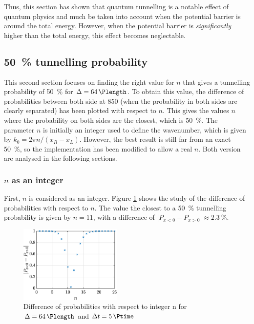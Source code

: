 \documentclass[a4paper,12pt,twoside]{article}
\newcommand{\abs}[1]{\left|#1\right|}
\begin{document}
    Thus, this section has shown that quantum tunnelling is a notable effect of quantum physics and much be taken into account when the potential barrier is around the total energy.
    However, when the potential barrier is \textit{significantly} higher than the total energy, this effect becomes neglectable.\\

  \subsection{\SI{50}{\percent} tunnelling probability} %
    This second section focuses on finding the right value for $n$ that gives a tunnelling probability of \SI{50}{\percent} for $\Delta = \SI{64}{\Plength}$.
    To obtain this value, the difference of probabilities between both side at \SI{850}{\Ptime} (when the probability in both sides are clearly separated) has been plotted with respect to $n$.
    This gives the values $n$ where the probability on both sides are the closest, which is \SI{50}{\percent}.
    The parameter $n$ is initially an integer used to define the wavenumber, which is given by $k_0 = 2\pi n/(x_R-x_L)$.
    However, the best result is still far from an exact \SI{50}{\percent}, so the implementation has been modified to allow a real $n$.
    Both version are analysed in the following sections.\\

    \subsubsection{$n$ as an integer}
      First, $n$ is considered as an integer.
      Figure \ref{fig:iii_findn_n} shows the study of the difference of probabilities with respect to $n$.
      The value the closest to a \SI{50}{\percent} tunnelling probability is given by $n = 11$, with a difference of $\abs{P_{x<0} - P_{x>0}} \approx \SI{2.3}{\percent}$.\\

      \begin{figure}[h]
        \centering
        \includegraphics[width=0.45\textwidth]{graphs/iii_findn_n.eps}
        \caption{Difference of probabilities with respect to integer n for $\Delta = \SI{64}{\Plength}$ and $\Delta t = \SI{5}{\Ptime}$}
        \label{fig:iii_findn_n}
      \end{figure}
\end{document}
